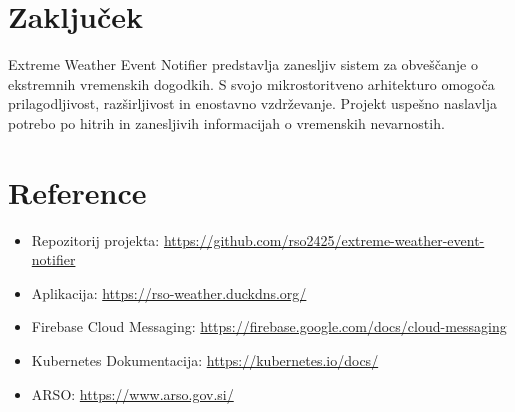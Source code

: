 \documentclass[a4paper,11pt]{article}
\begin{document}
\section*{Zaklju\v{c}ek}
Extreme Weather Event Notifier predstavlja zanesljiv sistem za obve\v{s}\v{c}anje o ekstremnih vremenskih dogodkih. S svojo mikrostoritveno arhitekturo omogo\v{c}a prilagodljivost, raz\v{s}irljivost in enostavno vzdr\v{z}evanje. Projekt uspe\v{s}no naslavlja potrebo po hitrih in zanesljivih informacijah o vremenskih nevarnostih.

\section*{Reference}
\begin{itemize}
    \item Repozitorij projekta: \url{https://github.com/rso2425/extreme-weather-event-notifier}
    \item Aplikacija: \url{https://rso-weather.duckdns.org/}
    \item Firebase Cloud Messaging: \url{https://firebase.google.com/docs/cloud-messaging}
    \item Kubernetes Dokumentacija: \url{https://kubernetes.io/docs/}
    \item ARSO: \url{https://www.arso.gov.si/}
\end{itemize}
\end{document}
